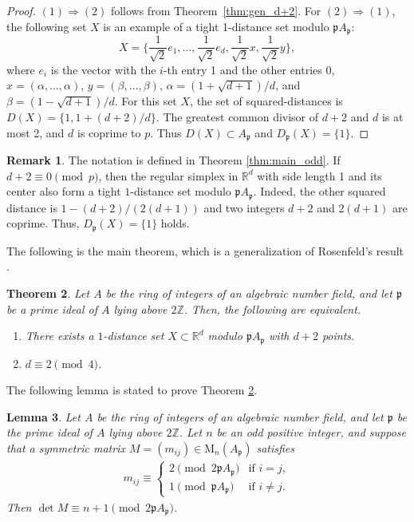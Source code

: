 \documentclass[a4paper, 11pt]{article}
\newcommand{\R}{\mathbb{R}}
\newcommand{\Z}{\mathbb{Z}}
\newcommand{\p}{\mathfrak{p}}
\newtheorem{theorem}{Theorem}[section]
\newtheorem{lemma}[theorem]{Lemma}
\theoremstyle{definition}
\newtheorem{remark}[theorem]{Remark}
\begin{document}
\begin{proof}
$(1) \Rightarrow (2)$ follows from Theorem~\ref{thm:gen_d+2}. 
For $(2) \Rightarrow (1)$, the following set $X$ is an example of a tight 1-distance set modulo $\p A_\p$: 
\begin{equation} \label{ex:regular}
X=\{\frac{1}{\sqrt{2}} e_1, \ldots, \frac{1}{\sqrt{2}} e_d, \frac{1}{\sqrt{2}} x, \frac{1}{\sqrt{2}}y \},
\end{equation}
where $e_i$ is the vector with the $i$-th entry 1 and the other entries 0, $x=(\alpha, \ldots ,\alpha)$, $y=(\beta,\ldots, \beta)$, 
$\alpha=(1+\sqrt{d+1})/d$, and $\beta=(1-\sqrt{d+1})/d$. 
For this set $X$, the set of squared-distances is $D(X)=\{1,1+(d+2)/d\}$.  The greatest common divisor of $d+2$ and $d$ is at most 2, and $d$ is coprime to $p$. Thus $D(X) \subset A_\p$ and $D_\p(X)=\{1\}$. 
\end{proof}
\begin{remark}
The notation is defined in Theorem \ref{thm:main_odd}. 
If $d+2 \equiv 0 \pmod{p}$, then the regular simplex in $\R^d$ with side length 1 and its center also form a tight $1$-distance set modulo $\p A_\p$. Indeed, 
the other squared distance is $1-(d+2)/(2(d+1))$ and two integers $d+2$ and $2(d+1)$ are coprime. Thus, $D_\p(X)=\{1\}$ holds.  
\end{remark}
The following is the main theorem, which is a generalization of Rosenfeld's result \cite{R97}. 
\begin{theorem} \label{thm:order2}
Let $A$ be the ring of integers of an algebraic number field, and 
let $\p$ be a prime ideal of $A$ lying above $2\Z$.  
Then, the following are equivalent. 
\begin{enumerate}
    \item There exists a $1$-distance set $X \subset \mathbb{R}^d$ modulo $\p A_\p$ with $d+2$ points.
    \item $d\equiv 2 \pmod{4}$. 
\end{enumerate}
\end{theorem}
The following lemma is stated to prove Theorem \ref{thm:order2}. 
\begin{lemma} \label{lem:to_prove}
Let $A$ be the ring of integers of an algebraic number field, and let $\p$ be the prime ideal of $A$ lying above $2\Z$. Let $n$ be an odd positive integer, and suppose that a symmetric matrix $M = (m_{ij}) \in \mathrm{M}_n(A_{\p})$ satisfies
\begin{align}
m_{ij} \equiv
\begin{cases}
2 \pmod{2\p A_{\p}} & \text{if } i = j,\\
1 \pmod{\p A_{\p}} & \text{if } i \ne j.
\end{cases}
\label{eq:matrix_mij}
\end{align}
Then $\det M \equiv n+1 \pmod{2\p A_{\p}}$.
\end{lemma}
\end{document}
